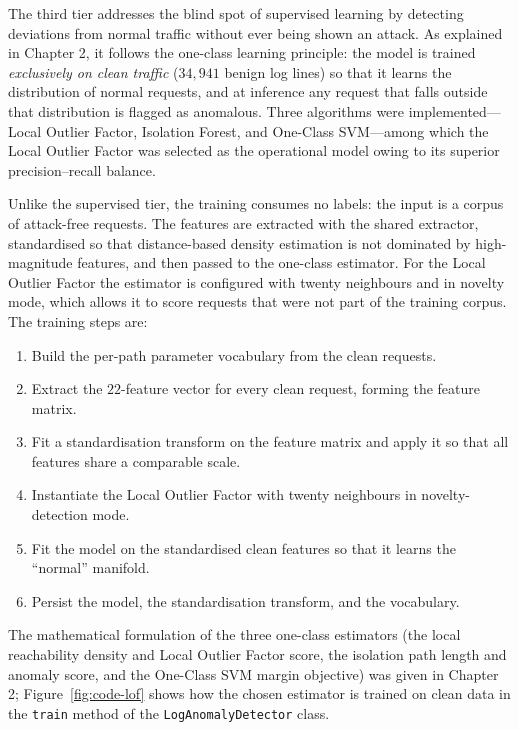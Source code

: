 \documentclass[../main.tex]{subfiles}
\begin{document}
The third tier addresses the blind spot of supervised learning by detecting
deviations from normal traffic without ever being shown an attack. As
explained in Chapter 2, it follows the one-class learning
principle: the model is trained \emph{exclusively on clean traffic}
($34{,}941$ benign log lines) so that it learns the distribution of normal
requests, and at inference any request that falls outside that distribution
is flagged as anomalous. Three algorithms were implemented---Local Outlier
Factor, Isolation Forest, and One-Class SVM---among which the Local Outlier
Factor was selected as the operational model owing to its superior
precision--recall balance.

Unlike the supervised tier, the training consumes no labels: the input is a
corpus of attack-free requests. The features are extracted with the shared
extractor, standardised so that distance-based density estimation is not
dominated by high-magnitude features, and then passed to the one-class
estimator. For the Local Outlier Factor the estimator is configured with
twenty neighbours and in novelty mode, which allows it to score requests
that were not part of the training corpus. The training steps are:

\begin{enumerate}[leftmargin=1.8em, itemsep=2pt]
  \item Build the per-path parameter vocabulary from the clean requests.
  \item Extract the $22$-feature vector for every clean request, forming the
        feature matrix.
  \item Fit a standardisation transform on the feature matrix and apply it
        so that all features share a comparable scale.
  \item Instantiate the Local Outlier Factor with twenty neighbours in
        novelty-detection mode.
  \item Fit the model on the standardised clean features so that it learns
        the ``normal'' manifold.
  \item Persist the model, the standardisation transform, and the
        vocabulary.
\end{enumerate}

The mathematical formulation of the three one-class estimators (the local
reachability density and Local Outlier Factor score, the isolation path
length and anomaly score, and the One-Class SVM margin objective) was given
in Chapter 2; Figure~\ref{fig:code-lof} shows how the chosen estimator is
trained on clean data in the \texttt{train} method of the
\texttt{LogAnomalyDetector} class.
\end{document}

